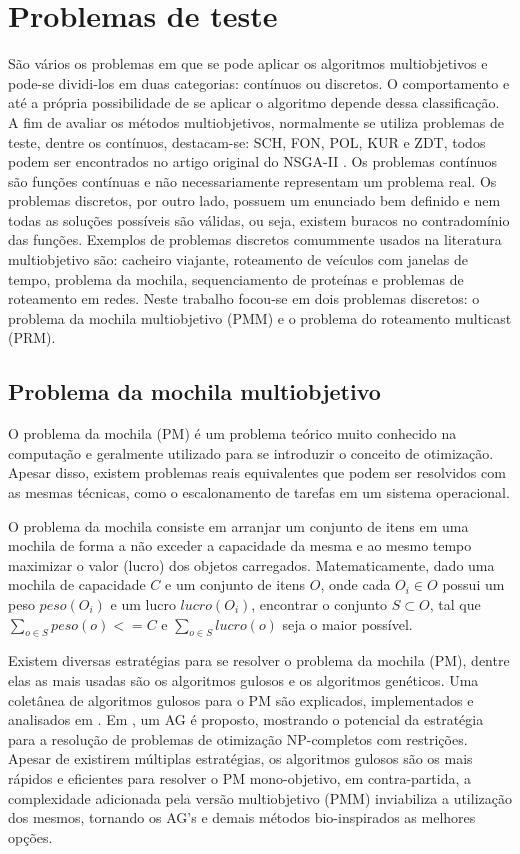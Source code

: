 \chapter[Problemas de teste]{Problemas de teste}

São vários os problemas em que se pode aplicar os algoritmos multiobjetivos e pode-se dividi-los em duas categorias: contínuos ou discretos. O comportamento e até a própria possibilidade de se aplicar o algoritmo depende dessa classificação. A fim de avaliar os métodos multiobjetivos, normalmente se utiliza problemas de teste, dentre os contínuos, destacam-se: SCH, FON, POL, KUR e ZDT, todos podem ser encontrados no artigo original do NSGA-II \cite{Deb2002}. Os problemas contínuos são funções contínuas e não necessariamente representam um problema real. Os problemas discretos, por outro lado, possuem um enunciado bem definido e nem todas as soluções possíveis são válidas, ou seja, existem buracos no contradomínio das funções. Exemplos de problemas discretos comummente usados na literatura multiobjetivo são: cacheiro viajante, roteamento de veículos com janelas de tempo, problema da mochila, sequenciamento de proteínas e problemas de roteamento em redes. Neste trabalho focou-se em dois problemas discretos: o problema da mochila multiobjetivo (PMM) e o problema do roteamento multicast (PRM).

\section{Problema da mochila multiobjetivo}

O problema da mochila (PM) é um problema teórico muito conhecido na computação e geralmente utilizado para se introduzir o conceito de otimização. Apesar disso, existem problemas reais equivalentes que podem ser resolvidos com as mesmas técnicas, como o escalonamento de tarefas em um sistema operacional.

O problema da mochila consiste em arranjar um conjunto de itens em uma mochila de forma a não exceder a capacidade da mesma e ao mesmo tempo maximizar o valor (lucro) dos objetos carregados. Matematicamente, dado uma mochila de capacidade $C$ e um conjunto de itens $O$, onde cada $O_i \in O$ possui um peso $peso(O_i)$ e um lucro $lucro(O_i)$, encontrar o conjunto $S \subset O$, tal que $\sum_{o \in S} peso(o) <= C$ e $\sum_{o \in S} lucro(o)$ seja o maior possível.

Existem diversas estratégias para se resolver o problema da mochila (PM), dentre elas as mais usadas são os algoritmos gulosos e os algoritmos genéticos. Uma coletânea de algoritmos gulosos para o PM são explicados, implementados e analisados em \cite{Martello1990}.  Em \cite{Khuri1994}, um AG é proposto, mostrando o potencial da estratégia para a resolução de problemas de otimização NP-completos com restrições. Apesar de existirem múltiplas estratégias, os algoritmos gulosos são os mais rápidos e eficientes para resolver o PM mono-objetivo, em contra-partida, a complexidade adicionada pela versão multiobjetivo (PMM) inviabiliza a utilização dos mesmos, tornando os AG's e demais métodos bio-inspirados as melhores opções.

